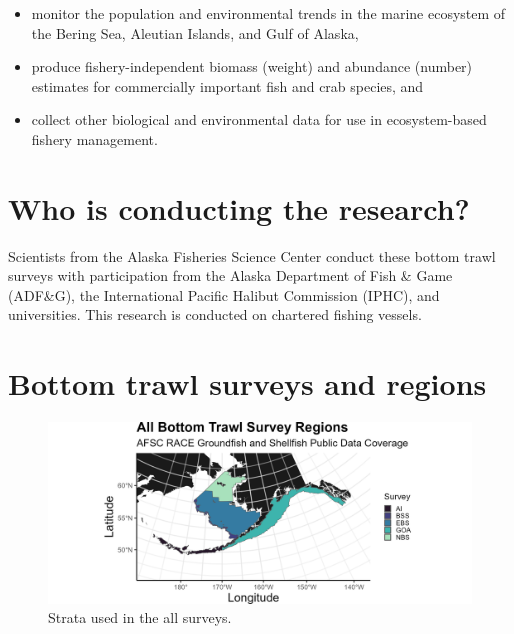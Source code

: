 \documentclass[
  letterpaper,
  oneside,
  open=any]{scrbook}
\providecommand{\tightlist}{%
  \setlength{\itemsep}{0pt}\setlength{\parskip}{0pt}}\usepackage{longtable,booktabs,array}
\begin{document}
\begin{itemize}
\tightlist
\item
  monitor the population and environmental trends in the marine
  ecosystem of the Bering Sea, Aleutian Islands, and Gulf of Alaska,
\item
  produce fishery-independent biomass (weight) and abundance (number)
  estimates for commercially important fish and crab species, and
\item
  collect other biological and environmental data for use in
  ecosystem-based fishery management.
\end{itemize}

\hypertarget{who-is-conducting-the-research-1}{%
\section{Who is conducting the
research?}\label{who-is-conducting-the-research-1}}

Scientists from the Alaska Fisheries Science Center conduct these bottom
trawl surveys with participation from the Alaska Department of Fish \&
Game (ADF\&G), the International Pacific Halibut Commission (IPHC), and
universities. This research is conducted on chartered fishing vessels.

\hypertarget{bottom-trawl-surveys-and-regions}{%
\section{Bottom trawl surveys and
regions}\label{bottom-trawl-surveys-and-regions}}

\begin{figure}

{\centering \includegraphics[width=7in,height=\textheight]{content/../img/survey_plot_all.png}

}

\caption{Strata used in the all surveys.}

\end{figure}
\end{document}
